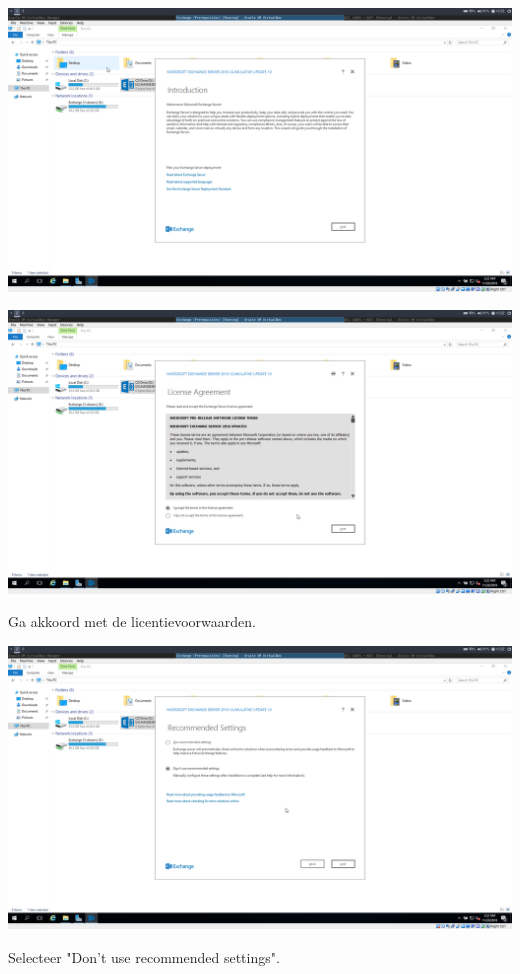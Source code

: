 \documentclass[a4paper]{article}
\begin{document}
\begin{center}
	\includegraphics[width=15cm]{Pictures/Exchange/install/1542712954.png}
	
	
\end{center}
\begin{center}
	\includegraphics[width=15cm]{Pictures/Exchange/install/1542712958.png}
	
	Ga akkoord met de licentievoorwaarden.
\end{center}
\begin{center}
	\includegraphics[width=15cm]{Pictures/Exchange/install/1542712963.png}
	
	Selecteer "Don't use recommended settings".
\end{center}
\end{document}
